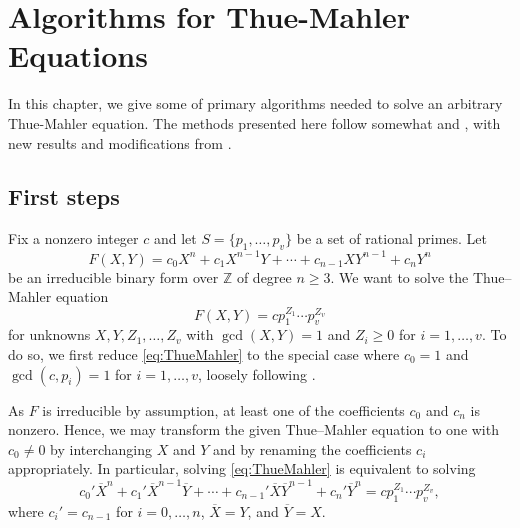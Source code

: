 
\chapter{Algorithms for Thue-Mahler Equations}
\label{ch:AlgorithmsForTM}

In this chapter, we give some of primary algorithms needed to solve an arbitrary Thue-Mahler equation. The methods presented here follow somewhat \cite{Ham} and \cite{TW3}, with new results and modifications from \cite{GhKaMaSi}. 


\section{First steps}
\label{sec:FirstSteps}

Fix a nonzero integer $c$ and let $S=\{p_1,\dotsc,p_v\}$ be a set of rational primes. Let
\[F(X,Y) = c_0 X^n + c_1 X^{n-1}Y + \cdots + c_{n-1}XY^{n-1} + c_nY^n\]
be an irreducible binary form over $\mathbb{Z}$ of degree $n \geq 3$. We want to solve the Thue--Mahler equation
\begin{equation} \label{eq:ThueMahler}
F(X,Y) = c p_1^{Z_1}\cdots p_v^{Z_v}
\end{equation}
for unknowns $X,Y, Z_1, \dots, Z_v$ with $\gcd(X,Y) = 1$ and $Z_i \geq 0$ for $i = 1,\dots, v$. To do so, we first reduce \eqref{eq:ThueMahler} to the special case where $c_0 = 1$ and $\gcd(c,p_i) = 1$ for $i = 1, \dots, v$, loosely following \cite{Ham}. 

As $F$ is irreducible by assumption, at least one of the coefficients $c_0$ and $c_n$ is nonzero. Hence, we may transform the given Thue--Mahler equation to one with $c_0 \neq 0$ by interchanging $X$ and $Y$ and by renaming the coefficients $c_i$ appropriately. In particular, solving \eqref{eq:ThueMahler} is equivalent to solving 
\[ c_0' \overline{X}^n + c_1' \overline{X}^{n-1}\overline{Y} + \cdots + c_{n-1}'\overline{X}\overline{Y}^{n-1} + c_n'\overline{Y}^n = c p_1^{Z_1}\cdots p_v^{Z_v},\]
where $c_i' = c_{n-1}$ for $i = 0, \dots, n$, $\overline{X} = Y$, and $\overline{Y} = X$. 


